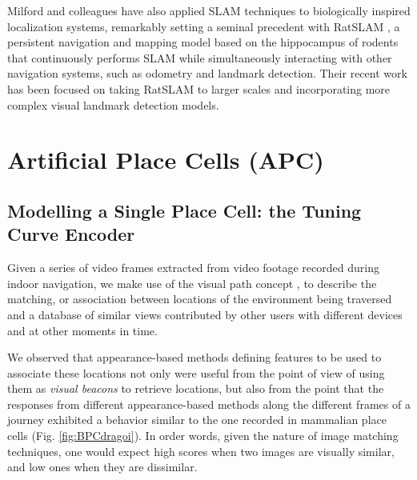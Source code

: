 Milford and colleagues have also applied SLAM techniques to biologically inspired localization systems, remarkably setting a seminal precedent with RatSLAM \cite{milford2004ratslam}, a persistent navigation and mapping model based on the hippocampus of rodents that continuously performs SLAM while simultaneously interacting with other navigation systems, such as odometry and landmark detection. Their recent work \cite{milford2012seqslam} has been focused on taking RatSLAM to larger scales and incorporating more complex visual landmark detection models. 



\section{Artificial Place Cells (APC)}

\subsection{Modelling a Single Place Cell: the Tuning Curve Encoder}


Given a series of video frames extracted from video footage recorded during indoor navigation, we make use of the visual path concept \cite{rivera2014bmvc, matsumoto1996visual, ohno1996autonomous}, to describe the matching, or association between locations of the environment being traversed and a database of similar views contributed by other users with different devices and at other moments in time.

We observed that appearance-based methods defining features to be used to associate these locations not only were useful from the point of view of using them as \textit{visual beacons} to retrieve locations, but also from the point that the responses from different appearance-based methods along the different frames of a journey exhibited a behavior similar to the one recorded in mammalian place cells (Fig. \ref{fig:BPCdragoi}). In order words, given the nature of image matching techniques, one would expect high scores when two images are visually similar, and low ones when they are dissimilar. 

